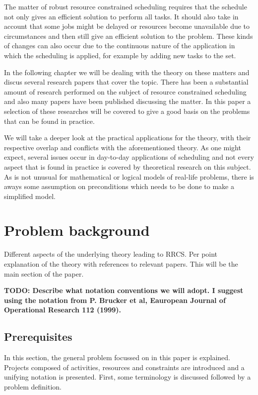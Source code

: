 \documentclass{article}
\newcommand{\TODO}[1]{{\color{red}\textbf{TODO: #1}}}
\begin{document}
The matter of robust resource constrained scheduling requires that the schedule not only gives an efficient solution to perform all tasks. It  should also take in account that some jobs might be delayed or resources become unavailable due to circumstances and then still give an efficient solution to the problem. These kinds of changes can also occur due to the continuous nature of the application in which the scheduling is applied, for example by adding new tasks to the set.

In the following chapter we will be dealing with the theory on these matters and discus several research papers that cover the topic. There has been a substantial amount of research performed on the subject of resource constrained scheduling and also many papers have been published discussing the matter. In this paper a selection of these researches will be covered to give a good basis on the problems that can be found in practice.

We will take a deeper look at the practical applications for the theory, with their respective overlap and conflicts with the aforementioned theory. As one might expect, several issues occur in day-to-day applications of scheduling and not every aspect that is found in practice is covered by theoretical research on this subject. As is not unusual for mathematical or logical models of real-life problems, there is aways some assumption on preconditions which needs to be done to make a simplified model.

\newpage

\section{Problem background}

Different aspects of the underlying theory leading to RRCS.  Per point explanation of the theory with references to relevant papers. This will be the main section of the paper.

\TODO{Describe what notation conventions we will adopt. I suggest using the notation from P. Brucker et al, Eauropean Journal of Operational Research 112 (1999). }

\subsection{Prerequisites}
In this section, the general problem focussed on in this paper is explained. Projects composed of activities, resources and constraints are introduced and a unifying notation is presented. First, some terminology is discussed followed by a problem definition.
\end{document}
